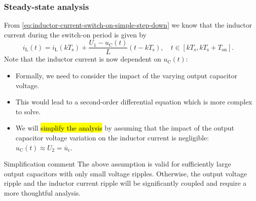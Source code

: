\begin{frame}
    \frametitle{Steady-state analysis}
    From \eqref{eq:inductor-current-switch-on-simple-step-down} we know that the inductor current during the switch-on period is given by
    \begin{equation*}
        i_\mathrm{L}(t) = i_\mathrm{L}(k T_\mathrm{s}) + \frac{U_1-u_\mathrm{C}(t)}{L} (t - k T_\mathrm{s}), \quad t\in [k T_\mathrm{s}, k T_\mathrm{s} + T_\mathrm{on}]. 
    \end{equation*}
    \pause
   Note that the inductor current is now dependent on $u_\mathrm{C}(t)$:
    \begin{itemize}
        \item Formally, we need to consider the impact of the varying output capacitor voltage. \pause
        \item This would lead to a second-order differential equation which is more complex to solve. \pause
        \item We will \hl{simplify the analysis} by assuming that the impact of the output capacitor voltage variation on the inductor current is negligible: $u_\mathrm{C}(t) \approx U_2=\overline{u}_\mathrm{c}$. \pause
    \end{itemize} 
    \vspace{-0.5cm}
    \begin{varblock}{Simplification comment}
        The above assumption is valid for sufficiently large output capacitors with only small voltage ripples. Otherwise, the output voltage ripple and the inductor current ripple will be significantly coupled and require a more thoughtful analysis.
    \end{varblock}
\end{frame}

